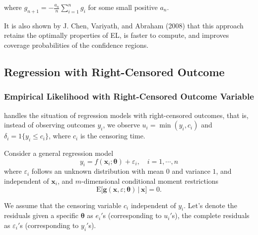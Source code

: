 \documentclass[article]{jss}
\renewcommand{\|}{\,|\,}
\begin{document}
where \(g_{n+1} = -\frac{a_n}{n} \sum_{i=1}^n g_i\) for some small positive \(a_n\).

It is also shown by J. Chen, Variyath, and Abraham (2008) that this approach retains the optimally properties of EL, is faster to compute, and improves coverage probabilities of the confidence regions.

\hypertarget{regression-with-right-censored-outcome}{%
\subsection{Regression with Right-Censored Outcome}\label{regression-with-right-censored-outcome}}

\hypertarget{empirical-likelihood-with-right-censored-outcome-variable}{%
\subsubsection{Empirical Likelihood with Right-Censored Outcome Variable}\label{empirical-likelihood-with-right-censored-outcome-variable}}

 handles the situation of regression models with right-censored outcomes, that is, instead of observing outcomes \(y_i\), we observe \(u_i = \min(y_i, c_i)\) and \(\delta_i = \mathfrak 1\{y_i \le c_i\}\), where \(c_i\) is the censoring time.

Consider a general regression model
\[
  y_i = f(\bm x_i; \bm \theta) + \varepsilon_i, \quad i=1,\cdots,n
\]
where \(\varepsilon_i\) follows an unknown distribution with mean \(0\) and variance \(1\), and independent of \(\bm x_i\), and \(m\)-dimensional conditional moment restrictions
\begin{equation}\label{eq:cmom}
  \textrm{E}\bigl[\bm g(\bm x, \varepsilon; \bm \theta) \,|\, \bm x\bigr] = 0.
\end{equation}

We assume that the censoring variable \(c_i\) independent of \(y_i\). Let's denote the residuals given a specific \(\bm \theta\) as \(e_i'\)s (corresponding to \(u_i'\)s), the complete residuals as \(\varepsilon_i'\)s (corresponding to \(y_i'\)s).
\end{document}
